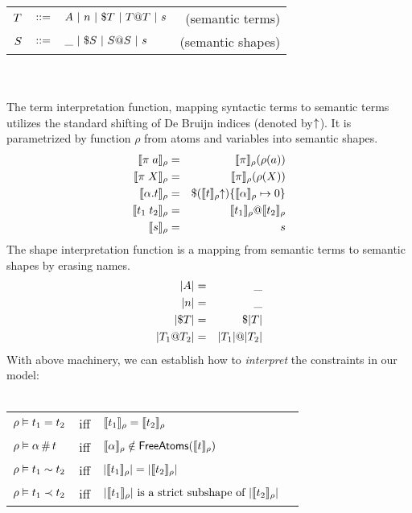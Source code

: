 \documentclass[english, mgr]{iithesis}
\renewcommand{\it}[1]{\textit{#1}}
\begin{document}
\begin{tabular}{rclr}
$T$ & $::=$ & $A
               \ |\  n
               \ |\  \$ T
               \ |\  T @ T
               \ |\  s$
    & (semantic terms) \\
$S$   & $::=$ & $\_
               \ |\  \$ S
               \ |\  S @ S
               \ |\  s$
    & (semantic shapes)
\end{tabular}
\\ \\
The term interpretation function, mapping syntactic terms to semantic terms
utilizes the standard shifting of De Bruijn indices (denoted by { }$\kern-3pt \uparrow$).
It is parametrized by function $\rho$ from atoms and variables into
semantic shapes.
\begin{eqnarray*}
  \llbracket \pi \; a \rrbracket_{\rho} & = &
    \llbracket \pi \rrbracket_{\rho}(\rho(a)) \\
  \llbracket \pi \; X \rrbracket_{\rho} & = &
    \llbracket \pi \rrbracket_{\rho}(\rho(X)) \\
  \llbracket \alpha. t \rrbracket_{\rho} & = &
    \$ (\llbracket t \rrbracket_{\rho} \kern-3pt \uparrow)
      \{\llbracket \alpha \rrbracket_{\rho}\mapsto0\} \\
  \llbracket t_1 \; t_2 \rrbracket_{\rho} & = &
    \llbracket t_1 \rrbracket_{\rho} @ \llbracket t_2 \rrbracket_{\rho} \\
  \llbracket s \rrbracket_{\rho} & = & s
\end{eqnarray*}
The shape interpretation function is a mapping from semantic terms to semantic
shapes by erasing names.
\begin{eqnarray*}
  |A|                     & = & \_ \\
  |n|                            & = & \_ \\
  |\$ T|             & = & \$ |T| \\
  |T_1 @ T_2| & = &
    |T_1| @ |T_2|
\end{eqnarray*}
With above machinery, we can establish how to \it{interpret} the constraints
in our model: \\ \\
\begin{tabular}{lclr}
  $\rho \vDash t_1 = t_2 $  & \textrm{iff} &
    $\llbracket t_1 \rrbracket_{\rho} = \llbracket t_2 \rrbracket_{\rho}$ \\
  $\rho \vDash \alpha \,\#\, t$ & \textrm{iff} &
    $\llbracket \alpha \rrbracket_{\rho} \notin
      \mathsf{FreeAtoms}(\llbracket t \rrbracket_{\rho})$ \\
  $\rho \vDash t_1 \sim t_2$ & \textrm{iff} &
    $|\llbracket t_1 \rrbracket_{\rho}| = |\llbracket t_2 \rrbracket_{\rho}|$ \\
  $\rho \vDash t_1 \prec t_2$ & \textrm{iff} &
    $|\llbracket t_1 \rrbracket_{\rho}| \textrm{ is a strict subshape of }
      |\llbracket t_2 \rrbracket_{\rho}|$ \\
\end{tabular}
\end{document}
